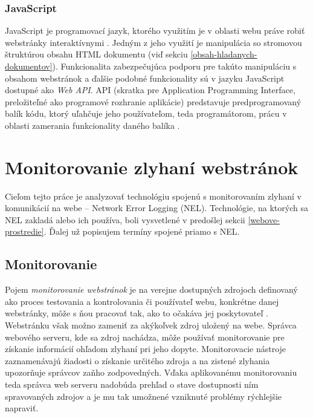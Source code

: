 \subsubsection{JavaScript}
\label{javascript}

JavaScript je programovací jazyk, ktorého využitím je v oblasti webu práve robiť webstránky interaktívnymi \cite{mdn-docs-js}. 
Jedným z jeho využití je manipulácia so stromovou štruktúrou obsahu HTML dokumentu (viď sekciu \ref{obsah-hladanych-dokumentov}).
Funkcionalita zabezpečujúca podporu pre takúto manipuláciu s obsahom webstránok a ďalšie podobné funkcionality sú v jazyku JavaScript dostupné ako \emph{Web API}.
API (skratka pre Application Programming Interface, preložiteľné ako programové rozhranie aplikácie) predstavuje predprogramovaný balík kódu, ktorý uľahčuje jeho používateľom, teda programátorom, prácu v oblasti zamerania funkcionality daného balíka \cite{mdn-docs-web-api}.

\section{Monitorovanie zlyhaní webstránok}

Cieľom tejto práce je analyzovať technológiu spojenú s monitorovaním zlyhaní v komunikácií 
na webe -- Network Error Logging (NEL).
Technológie, na ktorých sa NEL zakladá alebo ich používa, boli vysvetlené v predošlej sekcii \ref{webove-prostredie}.
Ďalej už popisujem termíny spojené priamo s NEL.

\subsection{Monitorovanie}
\label{monitorovanie}

Pojem \textit{monitorovanie webstránok} je na verejne dostupných zdrojoch definovaný ako proces testovania a kontrolovania či používateľ webu, konkrétne danej webstránky, môže s ňou pracovať tak, ako to očakáva jej poskytovateľ \cite{wiki-website-monitoring}. 
Webstránku však možno zameniť za akýkoľvek zdroj uložený na webe.
Správca webového serveru, kde sa zdroj nachádza, môže používať monitorovanie pre získanie informácií ohľadom zlyhaní pri jeho dopyte.
Monitorovacie nástroje zaznamenávajú žiadosti o získanie určitého zdroja a na zistené zlyhania upozorňuje správcov zaňho zodpovedných.  
Vďaka aplikovanému monitorovaniu teda správca web serveru nadobúda prehľad o stave dostupnosti ním spravovaných zdrojov a je mu tak umožnené vzniknuté problémy rýchlejšie napraviť.

